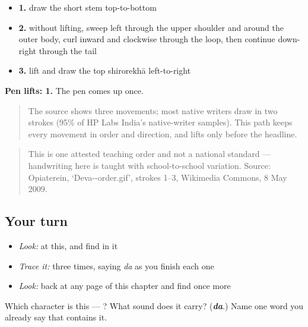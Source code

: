 \begin{itemize}
\raggedright
  \item \textbf{1.} draw the short stem top-to-bottom
  \item \textbf{2.} without lifting, sweep left through the upper shoulder and around the outer body, curl inward and clockwise through the loop, then continue down-right through the tail
  \item \textbf{3.} lift and draw the top shirorekhā left-to-right
\end{itemize}

\textbf{Pen lifts: 1.} The pen comes up once.

\begin{quote}
The source shows three movements; most native writers draw  in two strokes (95\% of HP Labs India's native-writer samples). This path keeps every movement in order and direction, and lifts only before the headline.
\end{quote}

\begin{quote}
This is one attested teaching order and not a national standard — handwriting here is taught with school-to-school variation. Source: Opiaterein, ‘Deva--order.gif’, strokes 1–3, Wikimedia Commons, 8 May 2009.
\end{quote}

\subsection*{Your turn}
\begin{itemize}
\raggedright
  \item \emph{Look:} at this, and find  in it
\end{itemize}

\begin{quote}
\end{quote}

\begin{itemize}
\raggedright
  \item \emph{Trace it:}  three times, saying \emph{da} as you finish each one
  \item \emph{Look:} back at any page of this chapter and find  once more
\end{itemize}

\begin{tcolorbox}[breakable,colback=teal!4,colframe=teal!35!black,title={Before you move on}]
Which character is this — ? What sound does it carry? (\emph{\textbf{da}}.) Name one word you already say that contains it.
\end{tcolorbox}
